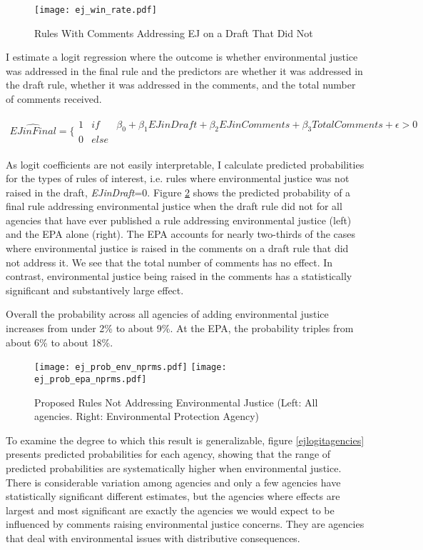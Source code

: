\begin{figure}[h!]
\caption{Rules With Comments Addressing EJ on a Draft That Did Not}
\centering
\texttt{[image: ej\_win\_rate.pdf]}
\label{ejwinrate}
\end{figure}




I estimate a logit regression where the outcome is whether environmental justice was addressed in the final rule and the predictors are whether it was addressed in the draft rule, whether it was addressed in the comments, and the total number of comments received. 

\begin{align*}
  \hat{EJ in Final} = \Bigg\{ \begin{array}{lll}
    1 & if &  \beta_0 + \beta_1 EJ in Draft + \beta_2 EJ in Comments + \beta_3 Total Comments  + \epsilon > 0\\
0 & else &  
  \end{array}
\end{align*}

As logit coefficients are not easily interpretable, I calculate predicted probabilities for the types of rules of interest, i.e. rules where environmental justice was not raised in the draft, \textit{EJinDraft}=0.  Figure \ref{ejpredicted} shows the predicted probability of a final rule addressing environmental justice when the draft rule did not for all agencies that have ever published a rule addressing environmental justice (left) and the EPA alone (right). The EPA accounts for nearly two-thirds of the cases where environmental justice is raised in the comments on a draft rule that did not address it. We see that the total number of comments has no effect. In contrast, environmental justice being raised in the comments has a statistically significant and substantively large effect. 

Overall the probability across all agencies of adding environmental justice increases from under 2\% to about 9\%. At the EPA, the probability triples from about 6\% to about 18\%. 


\begin{figure}[h!]
\caption{Proposed Rules Not Addressing Environmental Justice (Left: All agencies. Right: Environmental Protection Agency)}
\centering
\noindent
\texttt{[image: ej\_prob\_env\_nprms.pdf]}
\texttt{[image: ej\_prob\_epa\_nprms.pdf]}
\label{ejpredicted}
\end{figure}

To examine the degree to which this result is generalizable, figure \ref{ejlogitagencies} presents predicted probabilities for each agency, showing that the range of predicted probabilities are systematically higher when environmental justice. There is considerable variation among agencies and only a few agencies have statistically significant different estimates, but the agencies where effects are largest and most significant are exactly the agencies we would expect to be influenced by comments raising environmental justice concerns. They are agencies that deal with environmental issues with distributive consequences. 


